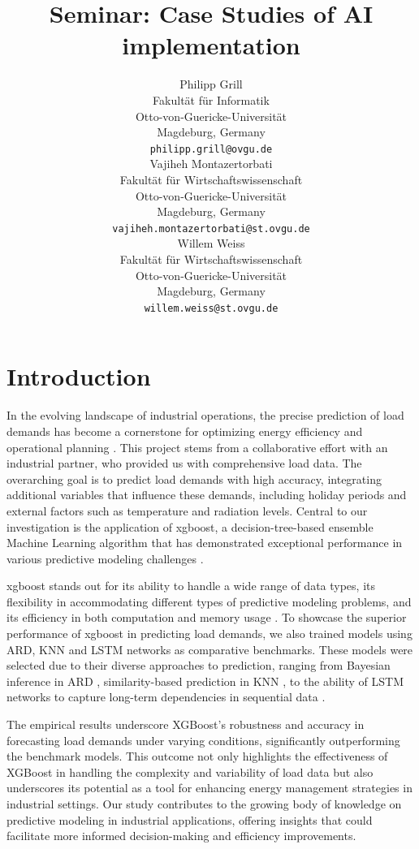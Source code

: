 \documentclass{article} %
\title{Seminar:
Case Studies of AI implementation }
\author{
Philipp Grill \\
Fakultät für Informatik\\
Otto-von-Guericke-Universität\\
Magdeburg, Germany \\
\texttt{philipp.grill@ovgu.de} \\
\And
Vajiheh Montazertorbati \\
Fakultät für Wirtschaftswissenschaft\\
Otto-von-Guericke-Universität\\
Magdeburg, Germany \\
\texttt{vajiheh.montazertorbati@st.ovgu.de} \\
\And
Willem Weiss \\
Fakultät für Wirtschaftswissenschaft\\
Otto-von-Guericke-Universität\\
Magdeburg, Germany \\
\texttt{willem.weiss@st.ovgu.de} \\
}
\begin{document}
\maketitle

\section{Introduction}
In the evolving landscape of industrial operations, the precise prediction of load demands has become a cornerstone for optimizing energy efficiency and operational planning \cite{semmelmann2022load}. This project stems from a collaborative effort with an industrial partner, who provided us with comprehensive load data. The overarching goal is to predict load demands with high accuracy, integrating additional variables that influence these demands, including holiday periods and external factors such as temperature and radiation levels. Central to our investigation is the application of \gls{xgboost}, a decision-tree-based ensemble Machine Learning algorithm that has demonstrated exceptional performance in various predictive modeling challenges \cite{chen2015xgboost}. 

\Gls{xgboost} stands out for its ability to handle a wide range of data types, its flexibility in accommodating different types of predictive modeling problems, and its efficiency in both computation and memory usage \cite{budholiya2022optimized}. To showcase the superior performance of \Gls{xgboost} in predicting load demands, we also trained models using \gls{ARD}, \gls{KNN} and \gls{LSTM} networks as comparative benchmarks. These models were selected due to their diverse approaches to prediction, ranging from Bayesian inference in \gls{ARD} \cite{qi2004predictive}, similarity-based prediction in \gls{KNN} \cite{cover1967nearest}, to the ability of \gls{LSTM} networks to capture long-term dependencies in sequential data \cite{hochreiter1997long}. 

The empirical results underscore XGBoost's robustness and accuracy in forecasting load demands under varying conditions, significantly outperforming the benchmark models. This outcome not only highlights the effectiveness of XGBoost in handling the complexity and variability of load data but also underscores its potential as a tool for enhancing energy management strategies in industrial settings. Our study contributes to the growing body of knowledge on predictive modeling in industrial applications, offering insights that could facilitate more informed decision-making and efficiency improvements. 
\end{document}
